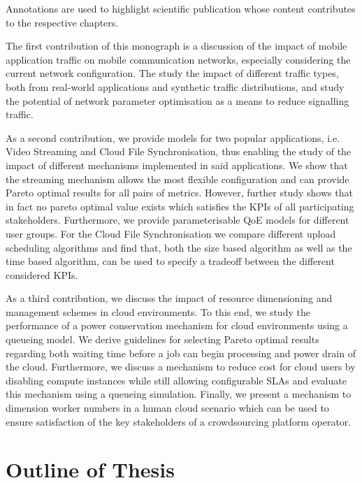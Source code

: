 Annotations are used to highlight scientific publication whose content contributes to the respective chapters.

The first contribution of this monograph is a discussion of the impact of mobile application traffic on mobile communication networks, especially considering the current network configuration.
The study the impact of different traffic types, both from real-world applications and synthetic traffic distributions, and study the potential of network parameter optimisation as a means to reduce signalling traffic.

As a second contribution, we provide models for two popular applications, i.e. Video Streaming and Cloud File Synchronisation, thus enabling the study of the impact of different mechanisms implemented in said applications.
We show that the streaming mechanism allows the most flexible configuration and can provide Pareto optimal results for all pairs of metrics.
However, further study shows that in fact no pareto optimal value exists which satisfies the \glspl{KPI} of all participating stakeholders.
Furthermore, we provide parameterisable \gls{QoE} models for different user groups.
For the Cloud File Synchronisation we compare different upload scheduling algorithms and find that, both the size based algorithm as well as the time based algorithm, can be used to specify a tradeoff between the different considered \glspl{KPI}.

As a third contribution, we discuss the impact of resource dimensioning and management schemes in cloud environments.
To this end, we study the performance of a power conservation mechanism for cloud environments using a queueing model.
We derive guidelines for selecting Pareto optimal results regarding both waiting time before a job can begin processing and power drain of the cloud.
Furthermore, we discuss a mechanism to reduce cost for cloud users by disabling compute instances while still allowing configurable \glspl{SLA} and evaluate this mechanism using a queueing simulation.
Finally, we present a mechanism to dimension worker numbers in a human cloud scenario which can be used to ensure satisfaction of the key stakeholders of a crowdsourcing platform operator.

\section{Outline of Thesis}\label{sec:introduction:outline}

